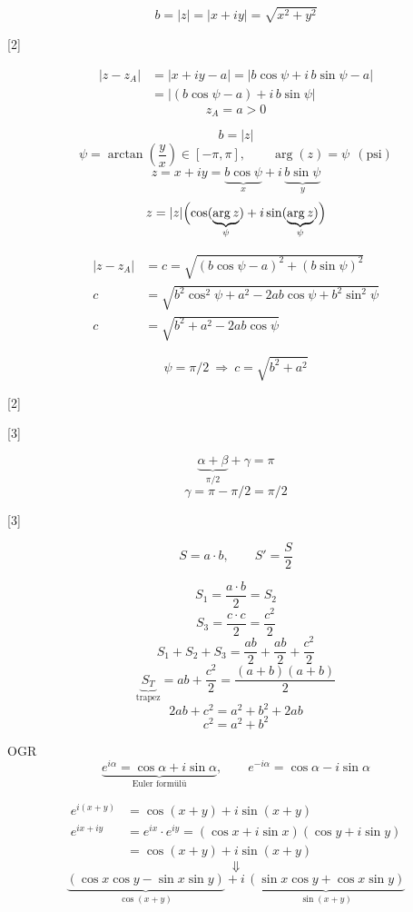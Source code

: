 \documentclass[11pt,a4paper]{article}
\begin{document}
\[ b = |z| = |x + iy| = \sqrt{x^2 + y^2} \]

[2]

\begin{align*}
|z - z_A| &= |x + iy - a| = |b\cos\psi + i\,b\sin\psi - a|\\
&= |(b\cos\psi - a) + i\,b\sin\psi|
\end{align*}
\[ z_A = a > 0 \]

\[ b = |z| \]
\[ \psi = \arctan\!\left(\frac{y}{x}\right) \in [-\pi,\pi], \qquad \arg(z) = \psi \ \ (\text{psi}) \]
\[ z = x + iy = \underbrace{b\cos\psi}_{x} + i\,\underbrace{b\sin\psi}_{y} \]
\[ z = |z|\Bigl(\cos(\underbrace{\arg z}_{\psi}) + i\sin(\underbrace{\arg z}_{\psi})\Bigr) \]

\begin{align*}
|z - z_A| &= c = \sqrt{(b\cos\psi - a)^2 + (b\sin\psi)^2}\\
c &= \sqrt{b^2\cos^2\psi + a^2 - 2ab\cos\psi + b^2\sin^2\psi}\\
c &= \sqrt{b^2 + a^2 - 2ab\cos\psi}
\end{align*}

\[ \psi = \pi/2 \ \Rightarrow\ c = \sqrt{b^2 + a^2} \]

[2]

[3]

\[ \underbrace{\alpha + \beta}_{\pi/2} + \gamma = \pi \]
\[ \gamma = \pi - \pi/2 = \pi/2 \]

[3]

\[ S = a\cdot b, \qquad S' = \frac{S}{2} \]

\[ S_1 = \frac{a\cdot b}{2} = S_2 \]
\[ S_3 = \frac{c\cdot c}{2} = \frac{c^2}{2} \]
\[ S_1 + S_2 + S_3 = \frac{ab}{2} + \frac{ab}{2} + \frac{c^2}{2} \]
\[ \underbrace{S_T}_{\text{trapez}} = ab + \frac{c^2}{2} = \frac{(a+b)(a+b)}{2} \]
\[ 2ab + c^2 = a^2 + b^2 + 2ab \]
\[ c^2 = a^2 + b^2 \]

\noindent OGR
\[ \underbrace{e^{i\alpha} = \cos\alpha + i\sin\alpha}_{\text{Euler formülü}}, \qquad e^{-i\alpha} = \cos\alpha - i\sin\alpha \]

\begin{align*}
e^{i(x+y)} &= \cos(x+y) + i\sin(x+y)\\
e^{ix+iy} &= e^{ix}\cdot e^{iy} = (\cos x + i\sin x)(\cos y + i\sin y)\\
&= \cos(x+y) + i\sin(x+y)
\end{align*}
\[ \Downarrow \]
\[ \underbrace{(\cos x\cos y - \sin x\sin y)}_{\cos(x+y)} + i\,\underbrace{(\sin x\cos y + \cos x\sin y)}_{\sin(x+y)} \]
\end{document}
